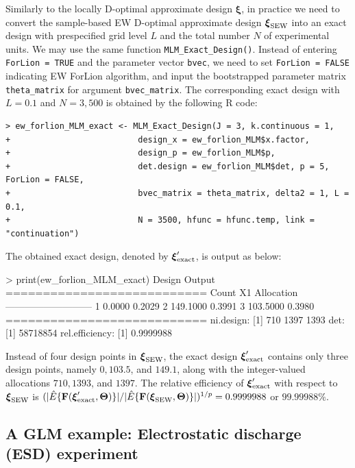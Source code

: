 \noindent
Similarly to the locally D-optimal approximate design $\boldsymbol{\xi}$, in practice we need to convert the sample-based EW D-optimal approximate design ${\boldsymbol{\xi}}_{\rm SEW}$ into an exact design with prespecified grid level $L$ and the total number $N$ of experimental units. We may use the same function \verb|MLM_Exact_Design()|. Instead of entering \verb|ForLion = TRUE| and the parameter vector \verb|bvec|, we need to set \verb|ForLion = FALSE| indicating EW ForLion algorithm, and input the bootstrapped parameter matrix \verb|theta_matrix| for argument \verb|bvec_matrix|. The corresponding exact design with $L = 0.1$ and $N = 3,500$ is obtained by the following R code:
\begin{Verbatim}
> ew_forlion_MLM_exact <- MLM_Exact_Design(J = 3, k.continuous = 1, 
+                          design_x = ew_forlion_MLM$x.factor,
+                          design_p = ew_forlion_MLM$p, 
+                          det.design = ew_forlion_MLM$det, p = 5, ForLion = FALSE,
+                          bvec_matrix = theta_matrix, delta2 = 1, L = 0.1, 
+                          N = 3500, hfunc = hfunc.temp, link = "continuation")
\end{Verbatim}
The obtained exact design,  denoted by ${\boldsymbol{\xi}}'_{\rm exact}$, is output as below:
\begin{example}
> print(ew_forlion_MLM_exact)
Design Output
=========================== 
Count  X1        Allocation
--------------------------- 
1        0.0000  0.2029
2      149.1000  0.3991
3      103.5000  0.3980
=========================== 
ni.design:
[1]  710 1397 1393
det:
[1] 58718854
rel.efficiency:
[1] 0.9999988
\end{example}

Instead of four design points in ${\boldsymbol{\xi}}_{\rm SEW}$, the exact design ${\boldsymbol{\xi}}'_{\rm exact}$ contains only three design points, namely $0, 103.5$, and $149.1$, along with the integer-valued allocations  $710, 1393$, and $1397$. The relative efficiency of ${\boldsymbol{\xi}}'_{\rm exact}$ with respect to ${\boldsymbol{\xi}}_{\rm SEW}$ is $(|\hat{E}\{{\mathbf F}({\boldsymbol{\xi}}'_{\rm exact}, \boldsymbol \Theta)\}|/|\hat{E}\{{\mathbf F}({\boldsymbol{\xi}}_{\rm SEW}, \boldsymbol\Theta)\}|)^{1/p} = 0.9999988$ or $99.99988\%$.

\subsection{A GLM example: Electrostatic discharge (ESD) experiment}\label{sec:ESD_example}

